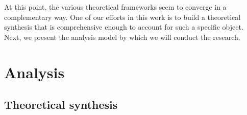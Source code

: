 \documentclass[a4paper, 12pt, openright, oneside, german, french, brazil, english, article]{abntex2}
\begin{document}
	
	At this point, the various theoretical frameworks seem to converge in a complementary way. One of our efforts in this work is to build a theoretical synthesis that is comprehensive enough to account for such a specific object. Next, we present the analysis model by which we will conduct the research.

	
	\section{Analysis}
	
	\subsection{Theoretical synthesis}

	
\end{document}
